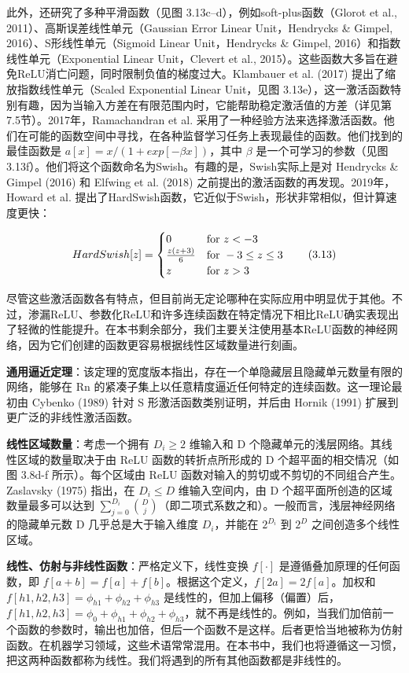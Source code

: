 此外，还研究了多种平滑函数（见图 3.13c–d），例如soft-plus函数（Glorot et al., 2011）、高斯误差线性单元（Gaussian Error Linear Unit，Hendrycks \& Gimpel, 2016）、S形线性单元（Sigmoid Linear Unit，Hendrycks \& Gimpel, 2016）和指数线性单元（Exponential Linear Unit，Clevert et al., 2015）。这些函数大多旨在避免ReLU消亡问题，同时限制负值的梯度过大。Klambauer et al. (2017) 提出了缩放指数线性单元（Scaled Exponential Linear Unit，见图 3.13e），这一激活函数特别有趣，因为当输入方差在有限范围内时，它能帮助稳定激活值的方差（详见第7.5节）。2017年，Ramachandran et al. 采用了一种经验方法来选择激活函数。他们在可能的函数空间中寻找，在各种监督学习任务上表现最佳的函数。他们找到的最佳函数是 \(a[x] = x/(1 + exp[−\beta x])\)，其中 \(\beta\) 是一个可学习的参数（见图 3.13f）。他们将这个函数命名为Swish。有趣的是，Swish实际上是对 Hendrycks \& Gimpel (2016) 和 Elfwing et al. (2018) 之前提出的激活函数的再发现。2019年，Howard et al. 提出了HardSwish函数，它近似于Swish，形状非常相似，但计算速度更快：

\[
HardSwish[z] =
\begin{cases} 
	0 & \text{for } z < -3 \notag \\
	\frac{z(z + 3)}{6} & \text{for } -3 \leq z \leq 3 \notag \\
	z & \text{for } z > 3 
\end{cases} \tag{3.13}
\]

尽管这些激活函数各有特点，但目前尚无定论哪种在实际应用中明显优于其他。不过，渗漏ReLU、参数化ReLU和许多连续函数在特定情况下相比ReLU确实表现出了轻微的性能提升。在本书剩余部分，我们主要关注使用基本ReLU函数的神经网络，因为它们创建的函数更容易根据线性区域数量进行刻画。

\textbf{通用逼近定理}：该定理的宽度版本指出，存在一个单隐藏层且隐藏单元数量有限的网络，能够在 Rn 的紧凑子集上以任意精度逼近任何特定的连续函数。这一理论最初由 Cybenko (1989) 针对 S 形激活函数类别证明，并后由 Hornik (1991) 扩展到更广泛的非线性激活函数。

\textbf{线性区域数量}：考虑一个拥有 \(D_i \geq 2\) 维输入和 D 个隐藏单元的浅层网络。其线性区域的数量取决于由 ReLU 函数的转折点所形成的 D 个超平面的相交情况（如图 3.8d-f 所示）。每个区域由 ReLU 函数对输入的剪切或不剪切的不同组合产生。Zaslavsky (1975) 指出，在 \(D_i \leq D\) 维输入空间内，由 D 个超平面所创造的区域数量最多可以达到 \(\sum_{j=0}^{D_i} \binom{D}{j}\)（即二项式系数之和）。一般而言，浅层神经网络的隐藏单元数 D 几乎总是大于输入维度 \(D_i\)，并能在 \(2^{D_i}\) 到 \(2^D\) 之间创造多个线性区域。

\textbf{线性、仿射与非线性函数}：严格定义下，线性变换 \(f[\cdot]\) 是遵循叠加原理的任何函数，即  \(f[a + b] = f[a] + f[b]\)。根据这个定义，\(f[2a] = 2f[a]\)。加权和 \(f[h1, h2, h3] = \phi_{h1} + \phi_{h2} + \phi_{h3}\) 是线性的，但加上偏移（偏置）后，\(f[h1, h2, h3] = \phi_0 + \phi_{h1} + \phi_{h2} + \phi_{h3}\)，就不再是线性的。例如，当我们加倍前一个函数的参数时，输出也加倍，但后一个函数不是这样。后者更恰当地被称为仿射函数。在机器学习领域，这些术语常常混用。在本书中，我们也将遵循这一习惯，把这两种函数都称为线性。我们将遇到的所有其他函数都是非线性的。


